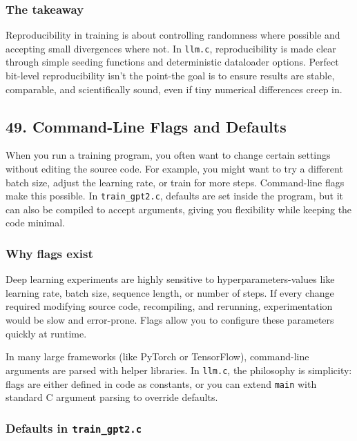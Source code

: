 \documentclass[
  letterpaper,
  DIV=11,
  numbers=noendperiod]{scrreprt}
\begin{document}
\subsubsection{The takeaway}\label{the-takeaway-37}

Reproducibility in training is about controlling randomness where
possible and accepting small divergences where not. In \texttt{llm.c},
reproducibility is made clear through simple seeding functions and
deterministic dataloader options. Perfect bit-level reproducibility
isn't the point-the goal is to ensure results are stable, comparable,
and scientifically sound, even if tiny numerical differences creep in.

\subsection{49. Command-Line Flags and
Defaults}\label{command-line-flags-and-defaults}

When you run a training program, you often want to change certain
settings without editing the source code. For example, you might want to
try a different batch size, adjust the learning rate, or train for more
steps. Command-line flags make this possible. In \texttt{train\_gpt2.c},
defaults are set inside the program, but it can also be compiled to
accept arguments, giving you flexibility while keeping the code minimal.

\subsubsection{Why flags exist}\label{why-flags-exist}

Deep learning experiments are highly sensitive to hyperparameters-values
like learning rate, batch size, sequence length, or number of steps. If
every change required modifying source code, recompiling, and rerunning,
experimentation would be slow and error-prone. Flags allow you to
configure these parameters quickly at runtime.

In many large frameworks (like PyTorch or TensorFlow), command-line
arguments are parsed with helper libraries. In \texttt{llm.c}, the
philosophy is simplicity: flags are either defined in code as constants,
or you can extend \texttt{main} with standard C argument parsing to
override defaults.

\subsubsection{\texorpdfstring{Defaults in
\texttt{train\_gpt2.c}}{Defaults in train\_gpt2.c}}\label{defaults-in-train_gpt2.c}
\end{document}
